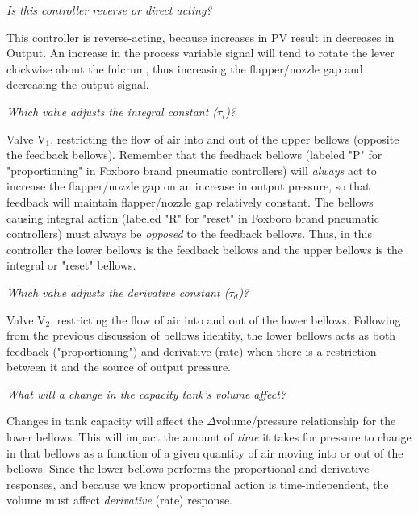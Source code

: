 





{\it Is this controller reverse or direct acting?}

This controller is reverse-acting, because increases in PV result in decreases in Output.  An increase in the process variable signal will tend to rotate the lever clockwise about the fulcrum, thus increasing the flapper/nozzle gap and decreasing the output signal.
 
\vskip 10pt

{\it Which valve adjusts the integral constant ($\tau_i$)?}

Valve V$_{1}$, restricting the flow of air into and out of the upper bellows (opposite the feedback bellows).  Remember that the feedback bellows (labeled "P" for "proportioning" in Foxboro brand pneumatic controllers) will {\it always} act to increase the flapper/nozzle gap on an increase in output pressure, so that feedback will maintain flapper/nozzle gap relatively constant.  The bellows causing integral action (labeled "R" for "reset" in Foxboro brand pneumatic controllers) must always be {\it opposed} to the feedback bellows.  Thus, in this controller the lower bellows is the feedback bellows and the upper bellows is the integral or "reset" bellows.
 
\vskip 10pt

{\it Which valve adjusts the derivative constant ($\tau_d$)?}

Valve V$_{2}$, restricting the flow of air into and out of the lower bellows.  Following from the previous discussion of bellows identity, the lower bellows acts as both feedback ("proportioning") and derivative (rate) when there is a restriction between it and the source of output pressure.
 
\vskip 10pt

{\it What will a change in the capacity tank's volume affect?}

Changes in tank capacity will affect the $\Delta$volume/pressure relationship for the lower bellows.  This will impact the amount of {\it time} it takes for pressure to change in that bellows as a function of a given quantity of air moving into or out of the bellows.  Since the lower bellows performs the proportional and derivative responses, and because we know proportional action is time-independent, the volume must affect {\it derivative} (rate) response.
 
